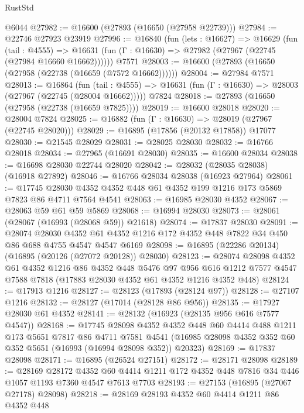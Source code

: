 \begin{lexlean}{RustStd}
\begin{coremodule}
{\begin{coremodule}
{{{{{{{{{{{{{{{{{{{{{{{{{{{{{{{{{{{{{{{{{{{{{{{{{{{{{{{    @6044
@27982 := @16600 (@27893 (@16650 (@27958 @22739)))
@27984 := @22746 @27923 @23919
@27996 := @16840
    (fun (lets : @16627) =>
    @16629
      (fun (tail : @4555) =>
      @16631 (fun (Γ : @16630) => @27982 (@27967 (@22745 (@27984 @16660 @16662))))))
    @7571
@28003 := @16600 (@27893 (@16650 (@27958 (@22738 (@16659 (@7572 @16662))))))
@28004 := @27984 @7571
@28013 := @16864
    (fun (tail : @4555) => @16631 (fun (Γ : @16630) => @28003 (@27967 (@22745 (@28004 @16662)))))
    @7824
@28018 := @27893 (@16650 (@27958 (@22738 (@16659 @7825))))
@28019 := @16600 @28018
@28020 := @28004 @7824
@28025 := @16882 (fun (Γ : @16630) => @28019 (@27967 (@22745 @28020)))
@28029 := @16895 (@17856 (@20132 @17858)) @17077
@28030 := @21545 @28029
@28031 := @28025 @28030
@28032 := @16766 @28018
@28034 := @27965 (@16691 @28030)
@28035 := @16600 @28034
@28038 := @16698 @28030 @22744 @28020
@28042 := @28032 (@28035 @28038) (@16918 @27892)
@28046 := @16766 @28034 @28038 (@16923 @27964)
@28061 := @17745 @28030 @4352 @4352 @448 @61 @4352 @199 @1216 @173 @5869 @7823 @86 @4711 @7564 @4541
@28063 := @16985 @28030 @4352
@28067 := @28063 @59 @61 @59 @5869
@28068 := @16994 @28030
@28073 := @28061 (@28067 (@16993 (@28068 @59)) @21618)
@28074 := @17837 @28030
@28091 := @28074
    @28030
    @4352
    @61
    @4352
    @1216
    @172
    @4352
    @448
    @7822
    @34
    @450
    @86
    @688
    @4755
    @4547
    @4547
    @6169
@28098 := @16895 (@22286 @20134) (@16895 (@20126 (@27072 @20128)) @28030)
@28123 := @28074
    @28098
    @4352
    @61
    @4352
    @1216
    @86
    @4352
    @448
    @5476
    @97
    @956
    @616
    @1212
    @7577
    @4547
    @7588
    @7818
    (@17883 @28030 @4352 @61 @4352 @1216 @4352 @448)
@28124 := @17913 @1216
@28127 := @28123 (@17893 (@28124 @97))
@28128 := @27107 @1216
@28132 := @28127 (@17014 (@28128 @86 @956))
@28135 := @17927 @28030 @61 @4352
@28141 := @28132 (@16923 (@28135 @956 @616 @7577 @4547))
@28168 := @17745
    @28098
    @4352
    @4352
    @448
    @60
    @4414
    @488
    @1211
    @173
    @5651
    @7817
    @86
    @4711
    @7581
    @4541
    (@16985 @28098 @4352 @352 @60 @352 @5651 (@16993 (@16994 @28098 @352)) @20323)
@28169 := @17837 @28098
@28171 := @16895 (@26524 @27151)
@28172 := @28171 @28098
@28189 := @28169
    @28172
    @4352
    @60
    @4414
    @1211
    @172
    @4352
    @448
    @7816
    @34
    @446
    @1057
    @1193
    @7360
    @4547
    @7613
    @7703
@28193 := @27153 (@16895 (@27067 @27178) @28098)
@28218 := @28169
    @28193
    @4352
    @60
    @4414
    @1211
    @86
    @4352
    @448
}}}}}}}}}}}}}}}}}}}}}}}}}}}}}}}}}}}}}}}}}}}}}}}}}}}}}}}
\end{coremodule}}
\end{coremodule}
\end{lexlean}
